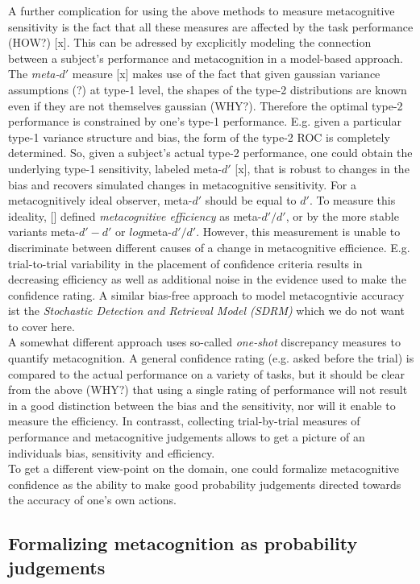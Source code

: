 \documentclass[../main/main.tex]{subfiles}
\begin{document}
	A further complication for using the above methods to measure metacognitive sensitivity is the fact that all these measures are affected by the task performance (HOW?) [x]. This can be adressed by excplicitly modeling the connection between a subject's performance and metacognition in a model-based approach. The \textit{meta-$d'$} measure [x] makes use of the fact that given gaussian variance assumptions (?) at type-1 level, the shapes of the type-2 distributions are known even if they are not themselves gaussian (WHY?). Therefore the optimal type-2 performance is constrained by one's type-1 performance. E.g. given a particular type-1 variance structure and bias, the form of the type-2 ROC is completely determined. So, given a subject's actual type-2 performance, one could obtain the underlying type-1 sensitivity, labeled meta-$d'$ [x], that is robust to changes in the bias and recovers simulated changes in metacognitive sensitivity. For a metacognitively ideal observer, meta-$d'$ should be equal to $d'$. To measure this ideality, [] defined \textit{metacognitive efficiency} as meta-$d'/d'$, or by the more stable variants meta-$d'-d'$ or $log$meta-$d'/d'$. However, this measurement is unable to discriminate between different causes of a change in metacognitive efficience. E.g. trial-to-trial variability in the placement of confidence criteria results in decreasing efficiency as well as additional noise in the evidence used to make the confidence rating. A similar bias-free approach to model metacogntivie accuracy ist the \textit{Stochastic Detection and Retrieval Model (SDRM)} which we do not want to cover here.\\
	A somewhat different approach uses so-called \textit{one-shot} discrepancy measures to quantify metacognition. A general confidence rating (e.g. asked before the trial) is compared to the actual performance on a variety of tasks, but it should be clear from the above (WHY?) that using a single rating of performance will not result in a good distinction between the bias and the sensitivity, nor will it enable to measure the efficiency. In contrasst, collecting trial-by-trial measures of performance and metacognitive judgements allows to get a picture of an individuals bias, sensitivity and efficiency.\\
	To get a different view-point on the domain, one could formalize metacognitive confidence as the ability to make good probability judgements directed towards the accuracy of one's own actions.
	
	\newpage
	\subsection{Formalizing metacognition as probability judgements}
	
\end{document}
